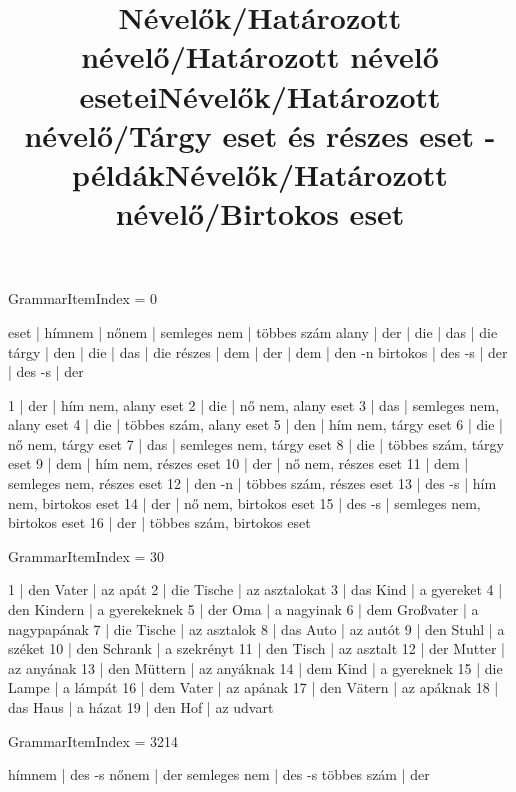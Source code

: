 \title{Névelők/Határozott névelő/Határozott névelő esetei}

GrammarItemIndex = 0

\begin{desc}
eset     | hímnem | nőnem | semleges nem | többes szám
alany    | der    | die   | das          | die
tárgy    | den    | die   | das          | die
részes   | dem    | der   | dem          | den -n
birtokos | des -s | der   | des -s       | der
\end{desc}

\begin{exmp}
1 | der | hím nem, alany eset
2 | die | nő nem, alany eset
3 | das | semleges nem, alany eset
4 | die | többes szám, alany eset
5 | den | hím nem, tárgy eset
6 | die | nő nem, tárgy eset
7 | das | semleges nem, tárgy eset
8 | die | többes szám, tárgy eset
9 | dem | hím nem, részes eset
10 | der | nő nem, részes eset
11 | dem | semleges nem, részes eset
12 | den -n | többes szám, részes eset
13 | des -s | hím nem, birtokos eset
14 | der | nő nem, birtokos eset
15 | des -s | semleges nem, birtokos eset
16 | der | többes szám, birtokos eset
\end{exmp}

\title{Névelők/Határozott névelő/Tárgy eset és részes eset - példák}

GrammarItemIndex = 30

\begin{desc}
\end{desc}

\begin{exmp}
1 | den Vater | az apát
2 | die Tische | az asztalokat
3 | das Kind | a gyereket
4 | den Kindern | a gyerekeknek
5 | der Oma | a nagyinak
6 | dem Großvater | a nagypapának
7 | die Tische | az asztalok
8 | das Auto | az autót
9 | den Stuhl | a széket
10 | den Schrank | a szekrényt
11 | den Tisch | az asztalt
12 | der Mutter | az anyának
13 | den Müttern | az anyáknak
14 | dem Kind | a gyereknek
15 | die Lampe | a lámpát
16 | dem Vater | az apának
17 | den Vätern | az apáknak
18 | das Haus | a házat
19 | den Hof | az udvart
\end{exmp}

\title{Névelők/Határozott névelő/Birtokos eset}

GrammarItemIndex = 3214

\begin{desc}
hímnem       | des -s
nőnem        | der
semleges nem | des -s
többes szám  | der
\end{desc}

